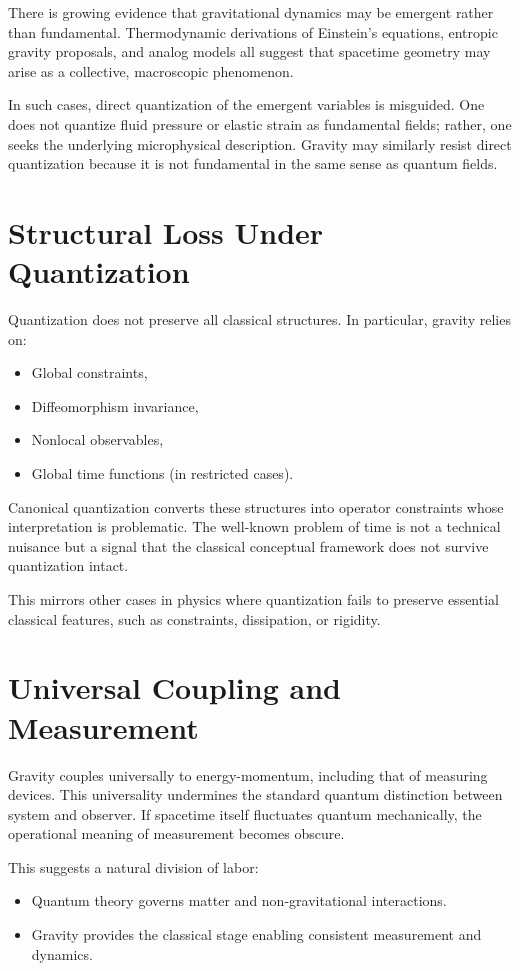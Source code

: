 \documentclass[12pt]{article}
\begin{document}
There is growing evidence that gravitational dynamics may be emergent rather
than fundamental. Thermodynamic derivations of Einstein’s equations, entropic
gravity proposals, and analog models all suggest that spacetime geometry may
arise as a collective, macroscopic phenomenon.

In such cases, direct quantization of the emergent variables is misguided. One
does not quantize fluid pressure or elastic strain as fundamental fields;
rather, one seeks the underlying microphysical description. Gravity may
similarly resist direct quantization because it is not fundamental in the same
sense as quantum fields.

\section{Structural Loss Under Quantization}

Quantization does not preserve all classical structures. In particular, gravity
relies on:
\begin{itemize}
    \item Global constraints,
    \item Diffeomorphism invariance,
    \item Nonlocal observables,
    \item Global time functions (in restricted cases).
\end{itemize}

Canonical quantization converts these structures into operator constraints
whose interpretation is problematic. The well-known problem of time is not a
technical nuisance but a signal that the classical conceptual framework does
not survive quantization intact.

This mirrors other cases in physics where quantization fails to preserve
essential classical features, such as constraints, dissipation, or rigidity.

\section{Universal Coupling and Measurement}

Gravity couples universally to energy-momentum, including that of measuring
devices. This universality undermines the standard quantum distinction between
system and observer. If spacetime itself fluctuates quantum mechanically, the
operational meaning of measurement becomes obscure.

This suggests a natural division of labor:
\begin{itemize}
    \item Quantum theory governs matter and non-gravitational interactions.
    \item Gravity provides the classical stage enabling consistent measurement and dynamics.
\end{itemize}
\end{document}
